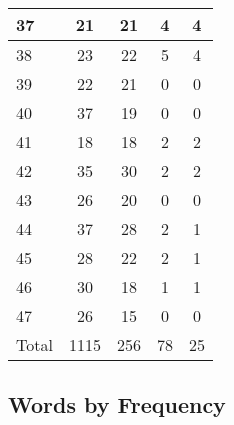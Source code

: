 \begin{center}
\begin{longtable}{l|c|c|c|c}
37 & 21 & 21 & 4 & 4\\ \hline
38 & 23 & 22 & 5 & 4\\ \hline
39 & 22 & 21 & 0 & 0\\ \hline
40 & 37 & 19 & 0 & 0\\ \hline
41 & 18 & 18 & 2 & 2\\ \hline
42 & 35 & 30 & 2 & 2\\ \hline
43 & 26 & 20 & 0 & 0\\ \hline
44 & 37 & 28 & 2 & 1\\ \hline
45 & 28 & 22 & 2 & 1\\ \hline
46 & 30 & 18 & 1 & 1\\ \hline
47 & 26 & 15 & 0 & 0\\ \hline
\hline \hline
Total & 1115 & 256 & 78 & 25



\end{longtable}
\end{center}

 
\subsection{Words by Frequency}

